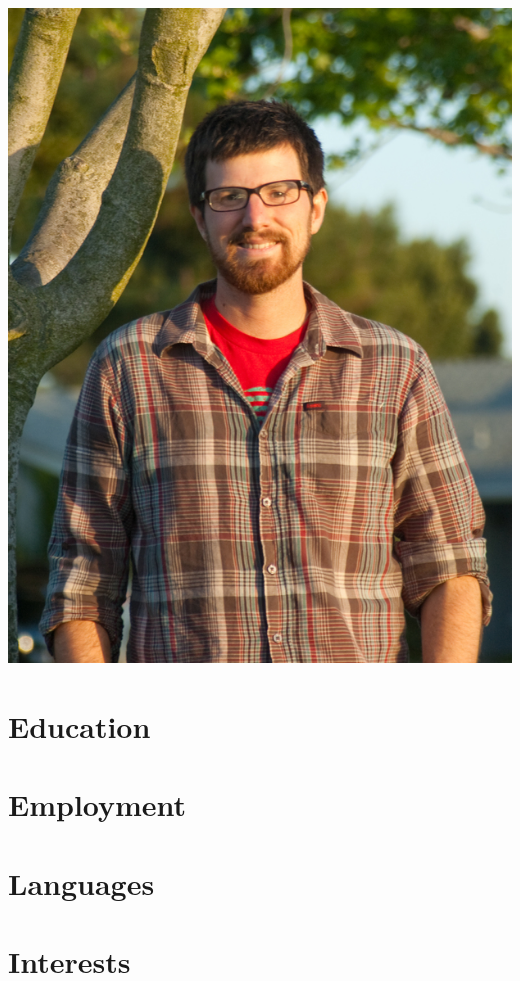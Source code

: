 


\thispagestyle{firstpagestyle}
\pagestyle{fancy}

\begin{center}
\vspace{10px}{\Large Patrick Sanan}\\
\end{center}
\vspace{10px}
\begin{minipage}{0.8\textwidth}

\end{minipage}
\begin{minipage}{0.19\textwidth}
  \includegraphics[width=\textwidth]{sanan_patrick_portrait_small.jpg}
\end{minipage}

\section*{Education}


\section*{Employment}


\section*{Languages}


\section*{Interests}


\thispagestyle{lastpagestyle}


